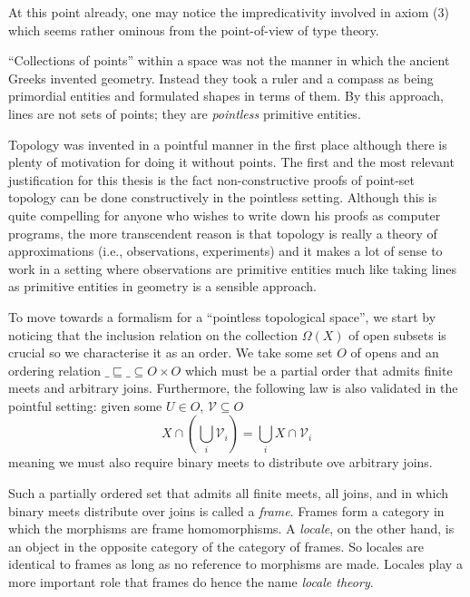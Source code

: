 \documentclass{article}
\begin{document}
At this point already, one may notice the impredicativity involved in axiom (3) which
seems rather ominous from the point-of-view of type theory.

``Collections of points'' within a space was not the manner in which the ancient
Greeks invented geometry. Instead they took a ruler and a compass as being primordial
entities and formulated shapes in terms of them. By this approach, lines are not sets of
points; they are \emph{pointless} primitive entities.

Topology was invented in a pointful manner in the first place although there is plenty of
motivation for doing it without points. The first and the most relevant justification for
this thesis is the fact non-constructive proofs of point-set topology can be done
constructively in the pointless setting. Although this is quite compelling for anyone who
wishes to write down his proofs as computer programs, the more transcendent reason is that
topology is really a theory of approximations (i.e., observations, experiments) and it
makes a lot of sense to work in a setting where observations are primitive entities much
like taking lines as primitive entities in geometry is a sensible approach.

To move towards a formalism for a ``pointless topological space'', we start by noticing
that the inclusion relation on the collection $\Omega(X)$ of open subsets is crucial so we
characterise it as an order. We take some set $O$ of opens and an ordering relation
$\_\sqsubseteq\_ \subseteq O \times O$ which must be a partial order that admits finite meets and arbitrary joins.
Furthermore, the following law is also validated in the pointful setting: given some $U \in
O$, $\mathcal{V} \subseteq O$
\begin{equation*}
  X \cap (\bigcup_{i} \mathcal{V}_i) = \bigcup_{i} X \cap \mathcal{V}_i
\end{equation*}
meaning we must also require binary meets to distribute ove arbitrary joins.

Such a partially ordered set that admits all finite meets, all joins, and in which binary
meets distribute over joins is called a \emph{frame}. Frames form a category in which the
morphisms are frame homomorphisms. A \emph{locale}, on the other hand, is an object in the
opposite category of the category of frames. So locales are identical to frames as long as
no reference to morphisms are made. Locales play a more important role that frames do
hence the name \emph{locale theory}.
\end{document}
